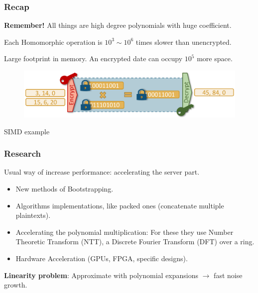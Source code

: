 \documentclass[10pt]{beamer}
\begin{document}

\begin{frame}
\frametitle{Recap}

    \textbf{Remember!} All things are high degree polynomials with huge coefficient.


Each Homomorphic operation is $10^3 \sim 10^6$ times slower than unencrypted.
\pause

Large footprint in memory.
An encrypted date can occupy $10^5$ more space.

\pause

        \begin{figure}[h!]
            \centering
            \includegraphics[scale=0.8]{workflow.png}
        \end{figure}
    \centering
        SIMD example


\end{frame}


\begin{frame}
\frametitle{Research}

    Usual way of increase performance:  accelerating the server part.
\pause
\begin{itemize}\itemsep-0.7em
   \item New methods of Bootstrapping.
   \item Algorithms implementations, like packed ones (concatenate multiple plaintexts).
       \pause
   \item Accelerating the polynomial multiplication:
       For these they use Number Theoretic Transform (NTT), a Discrete Fourier Transform (DFT) over a ring.
   \item Hardware Acceleration (GPUs, FPGA, specific designs).
\end{itemize}
\pause

    \textbf{Linearity problem}: Approximate with polynomial expansions $\rightarrow$ fast noise growth.
\end{frame}
\end{document}
